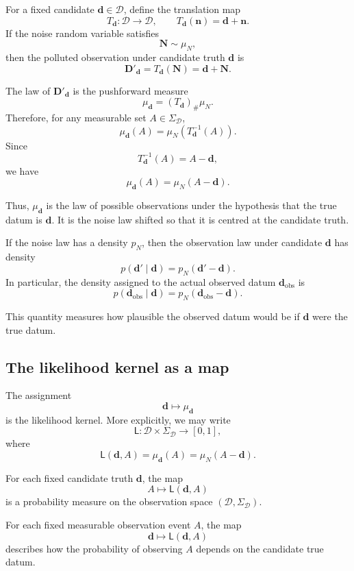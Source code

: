 \documentclass[11pt]{article}
\newcommand{\Dspace}{\mathcal D}
\newcommand{\SigmaD}{\Sigma_{\mathcal D}}
\newcommand{\muN}{\mu_N}
\newcommand{\Dobsrand}{\mathbf D'}
\newcommand{\Nrand}{\mathbf N}
\newcommand{\dobs}{\mathbf d_{\mathrm{obs}}}
\begin{document}
For a fixed candidate \(\mathbf d\in\Dspace\), define the translation map
\[
    T_{\mathbf d}:\Dspace\to\Dspace,
    \qquad
    T_{\mathbf d}(\mathbf n)=\mathbf d+\mathbf n.
\]
If the noise random variable satisfies
\[
    \Nrand\sim\muN,
\]
then the polluted observation under candidate truth \(\mathbf d\) is
\[
    \Dobsrand_{\mathbf d}
    =
    T_{\mathbf d}(\Nrand)
    =
    \mathbf d+\Nrand.
\]

The law of \(\Dobsrand_{\mathbf d}\) is the pushforward measure
\[
    \mu_{\mathbf d}
    =
    (T_{\mathbf d})_{\#}\muN.
\]
Therefore, for any measurable set \(A\in\SigmaD\),
\[
    \mu_{\mathbf d}(A)
    =
    \muN\!\left(T_{\mathbf d}^{-1}(A)\right).
\]
Since
\[
    T_{\mathbf d}^{-1}(A)
    =
    A-\mathbf d,
\]
we have
\[
    \mu_{\mathbf d}(A)
    =
    \muN(A-\mathbf d).
\]

Thus, \(\mu_{\mathbf d}\) is the law of possible observations under the hypothesis that the true datum is \(\mathbf d\). It is the noise law shifted so that it is centred at the candidate truth.

If the noise law has a density \(p_N\), then the observation law under candidate \(\mathbf d\) has density
\[
    p(\mathbf d'\mid \mathbf d)
    =
    p_N(\mathbf d'-\mathbf d).
\]
In particular, the density assigned to the actual observed datum \(\dobs\) is
\[
    p(\dobs\mid \mathbf d)
    =
    p_N(\dobs-\mathbf d).
\]

This quantity measures how plausible the observed datum would be if \(\mathbf d\) were the true datum.

\subsection{The likelihood kernel as a map}

The assignment
\[
    \mathbf d
    \longmapsto
    \mu_{\mathbf d}
\]
is the likelihood kernel. More explicitly, we may write
\[
    \mathsf L:\Dspace\times\SigmaD\to[0,1],
\]
where
\[
    \mathsf L(\mathbf d,A)
    =
    \mu_{\mathbf d}(A)
    =
    \muN(A-\mathbf d).
\]

For each fixed candidate truth \(\mathbf d\), the map
\[
    A\longmapsto \mathsf L(\mathbf d,A)
\]
is a probability measure on the observation space \((\Dspace,\SigmaD)\).

For each fixed measurable observation event \(A\), the map
\[
    \mathbf d\longmapsto \mathsf L(\mathbf d,A)
\]
describes how the probability of observing \(A\) depends on the candidate true datum.
\end{document}

